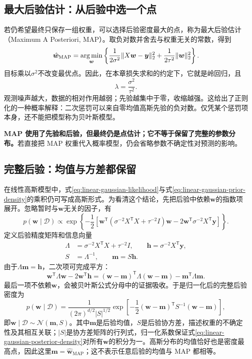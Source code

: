 \subsection{最大后验估计：从后验中选一个点}
若仍希望最终只保存一组权重，可以选择后验密度最大的点，称为最大后验估计（Maximum A Posteriori, MAP）。取负对数并舍去与权重无关的常数，得到
\begin{equation}
 \hat{\bm w}_{\mathrm{MAP}}=\mathop{\mathrm{arg\,min}}_{\bm w}
 \left\{\frac1{2\sigma^2}\|X\bm w-\bm y\|_2^2
 +\frac1{2\tau^2}\|\bm w\|_2^2\right\}.
\end{equation}
目标乘以$\sigma^2$不改变最优点。因此，在本章损失求和的约定下，它就是岭回归，且
\begin{equation}
 \lambda=\frac{\sigma^2}{\tau^2}.
\end{equation}
观测噪声越大，数据的相对作用越弱；先验越集中于零，收缩越强。这给出了正则化的一种概率解释：二次惩罚可以来自零均值高斯先验的负对数。仅凭某个惩罚项本身，还不能把模型称为贝叶斯模型。

\textbf{MAP 使用了先验和后验，但最终仍是点估计；它不等于保留了完整的参数分布。}若直接把 MAP 权重代入概率模型，仍会省略参数不确定性对预测的影响。

\subsection{完整后验：均值与方差都保留}
在线性高斯模型中，式\eqref{eq:linear-gaussian-likelihood}与式\eqref{eq:linear-gaussian-prior-density}的乘积仍可写成高斯形式。为看清这个结论，先把后验中依赖$\bm w$的指数项展开。忽略暂时与$\bm w$无关的因子，有
\begin{equation}
 p(\bm w\mid\mathcal D)\propto
 \exp\left\{-\frac12\left[
 \bm w^{\mathsf T}(\sigma^{-2}X^{\mathsf T}X+\tau^{-2}I)\bm w
 -2\bm w^{\mathsf T}\sigma^{-2}X^{\mathsf T}\bm y
 \right]\right\}.
\end{equation}
定义后验精度矩阵和信息向量
\begin{align}
 \Lambda&=\sigma^{-2}X^{\mathsf T}X+\tau^{-2}I,\qquad
 \bm h=\sigma^{-2}X^{\mathsf T}\bm y,\\
 S&=\Lambda^{-1},\qquad \bm m=S\bm h.
\end{align}
由于$\Lambda\bm m=\bm h$，二次项可完成平方：
\begin{equation}
 \bm w^{\mathsf T}\Lambda\bm w-2\bm w^{\mathsf T}\bm h
 =(\bm w-\bm m)^{\mathsf T}\Lambda(\bm w-\bm m)
 -\bm m^{\mathsf T}\Lambda\bm m.
 \label{eq:linear-posterior-completing-square}
\end{equation}
最后一项不依赖$\bm w$，会被贝叶斯公式分母中的证据吸收。于是归一化后的完整后验密度为
\begin{equation}
 p(\bm w\mid\mathcal D)=
 \frac{1}{(2\pi)^{d/2}|S|^{1/2}}
 \exp\left[-\frac12(\bm w-\bm m)^{\mathsf T}S^{-1}(\bm w-\bm m)\right],
 \label{eq:linear-gaussian-posterior-density}
\end{equation}
即$\bm w\mid\mathcal D\sim\mathcal N(\bm m,S)$。其中$\bm m$是后验均值，$S$是后验协方差，描述权重的不确定性及其相互关联；$|S|$是协方差矩阵的行列式，归一化系数保证式\eqref{eq:linear-gaussian-posterior-density}对所有$\bm w$的积分为一。高斯分布的均值恰好也是密度最高点，因此这里$\bm m=\hat{\bm w}_{\mathrm{MAP}}$；这不表示任意后验的均值与 MAP 都相等。

